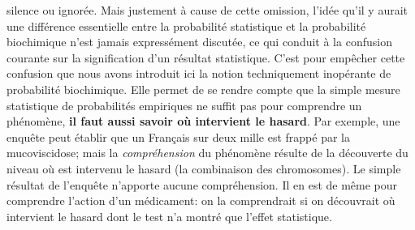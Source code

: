 silence ou ignor\'ee. Mais justement \`a cause de cette omission, 
l'id\'ee qu'il y aurait une diff\'erence essentielle entre la
probabilit\'e statistique et la probabilit\'e biochimique n'est jamais
express\'ement discut\'ee, ce qui conduit \`a la confusion courante 
sur la signification d'un r\'esultat statistique. C'est pour emp\^echer 
cette confusion que nous avons introduit ici la notion techniquement 
inop\'erante de probabilit\'e biochimique. Elle permet de se rendre compte 
que la simple mesure statistique de probabilit\'es empiriques ne suffit 
pas pour comprendre un ph\'enom\`ene, {\bf il faut aussi savoir o\`u 
intervient le hasard}. Par exemple, une enqu\^ete peut \'etablir que un 
Fran\c{c}ais sur deux mille est frapp\'e par la mucoviscidose; mais la 
{\it compr\'ehension} du ph\'enom\`ene r\'esulte de la d\'ecouverte du 
niveau o\`u est intervenu le hasard (la combinaison des chromosomes). 
Le simple r\'esultat de l'enqu\^ete n'apporte aucune compr\'ehension. 
Il en est de m\^eme pour comprendre l'action d'un m\'edicament: on la 
comprendrait si on d\'ecouvrait o\`u intervient le hasard dont le test 
n'a montr\'e que l'effet statistique.
\medskip

